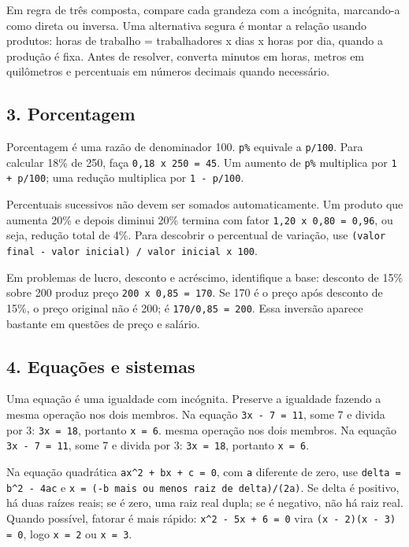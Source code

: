 \documentclass[11pt,a4paper]{article}
\begin{document}
Em regra de três composta, compare cada grandeza com a incógnita, marcando-a como direta ou inversa. Uma alternativa segura é montar a relação usando produtos: horas de trabalho = trabalhadores x dias x horas por dia, quando a produção é fixa. Antes de resolver, converta minutos em horas, metros em quilômetros e percentuais em números decimais quando necessário.

\subsection*{3. Porcentagem}

Porcentagem é uma razão de denominador 100. \texttt{p\%} equivale a \texttt{p/100}. Para calcular 18\% de 250, faça \texttt{0,18 x 250 = 45}. Um aumento de \texttt{p\%} multiplica por \texttt{1 + p/100}; uma redução multiplica por \texttt{1 - p/100}.

Percentuais sucessivos não devem ser somados automaticamente. Um produto que aumenta 20\% e depois diminui 20\% termina com fator \texttt{1,20 x 0,80 = 0,96}, ou seja, redução total de 4\%. Para descobrir o percentual de variação, use \texttt{(valor final - valor inicial) / valor inicial x 100}.

Em problemas de lucro, desconto e acréscimo, identifique a base: desconto de 15\% sobre 200 produz preço \texttt{200 x 0,85 = 170}. Se 170 é o preço após desconto de 15\%, o preço original não é 200; é \texttt{170/0,85 = 200}. Essa inversão aparece bastante em questões de preço e salário.

\subsection*{4. Equações e sistemas}

Uma equação é uma igualdade com incógnita. Preserve a igualdade fazendo a mesma operação nos dois membros. Na equação \texttt{3x - 7 = 11}, some 7 e divida por 3: \texttt{3x = 18}, portanto \texttt{x = 6}. mesma operação nos dois membros. Na equação \texttt{3x - 7 = 11}, some 7 e divida por 3: \texttt{3x = 18}, portanto \texttt{x = 6}.

Na equação quadrática \texttt{ax\textasciicircum{}2 + bx + c = 0}, com \texttt{a} diferente de zero, use \texttt{delta = b\textasciicircum{}2 - 4ac} e \texttt{x = (-b mais ou menos raiz de delta)/(2a)}. Se delta é positivo, há duas raízes reais; se é zero, uma raiz real dupla; se é negativo, não há raiz real. Quando possível, fatorar é mais rápido: \texttt{x\textasciicircum{}2 - 5x + 6 = 0} vira \texttt{(x - 2)(x - 3) = 0}, logo \texttt{x = 2} ou \texttt{x = 3}.
\end{document}
